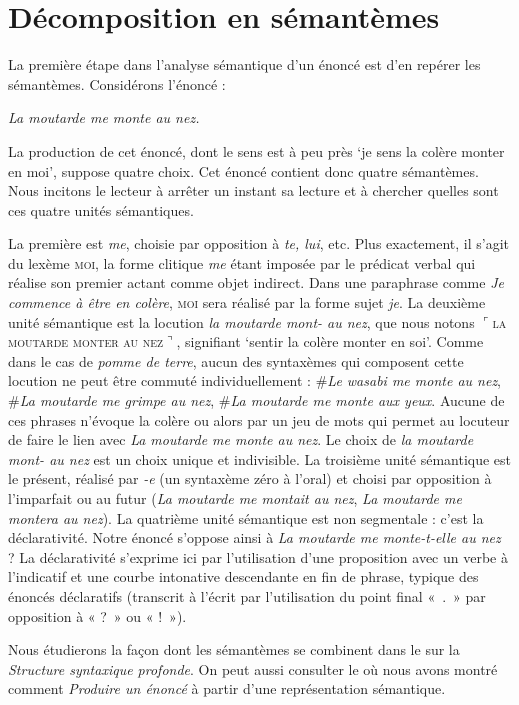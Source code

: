 \section{Décomposition en sémantèmes}\label{sec:2.3.5}

La première étape dans l’analyse sémantique d’un énoncé est d’en repérer les sémantèmes. Considérons l’énoncé :

\ea\itshape La moutarde me monte au nez.\z

La production de cet énoncé, dont le sens est à peu près ‘je sens la colère monter en moi’, suppose quatre choix. Cet énoncé contient donc quatre sémantèmes. Nous incitons le lecteur à arrêter un instant sa lecture et à chercher quelles sont ces quatre unités sémantiques.

La première est \textit{me}, choisie par opposition à \textit{te, lui}, etc. Plus exactement, il s’agit du lexème \textsc{moi}, la forme clitique \textit{me} étant imposée par le prédicat verbal qui réalise son premier actant comme objet indirect. Dans une paraphrase comme \textit{Je commence à être en colère}, \textsc{moi} sera réalisé par la forme sujet \textit{je}. La deuxième unité sémantique est la locution \textit{la moutarde mont- au nez}, que nous notons $⌜$\textsc{la} \textsc{moutarde} \textsc{monter} \textsc{au} \textsc{nez}$⌝$, signifiant ‘sentir la colère monter en soi’. Comme dans le cas de \textit{pomme de terre}, aucun des syntaxèmes qui composent cette locution ne peut être commuté individuellement : \#\textit{Le wasabi me monte au nez}, \#\textit{La moutarde me grimpe au nez}, \#\textit{La moutarde me monte aux yeux}. Aucune de ces phrases n’évoque la colère ou alors par un jeu de mots qui permet au locuteur de faire le lien avec \textit{La moutarde me monte au nez}. Le choix de \textit{la moutarde mont- au nez} est un choix unique et indivisible. La troisième unité sémantique est le présent, réalisé par \textit{{}-e} (un syntaxème zéro à l’oral) et choisi par opposition à l’imparfait ou au futur (\textit{La moutarde me montait au nez}, \textit{La moutarde me montera au nez}). La quatrième unité sémantique est non segmentale : c’est la déclarativité. Notre énoncé s’oppose ainsi à \textit{La moutarde me monte-t-elle au nez} ? La déclarativité s’exprime ici par l’utilisation d’une proposition avec un verbe à l’indicatif et une courbe intonative descendante en fin de phrase, typique des énoncés déclaratifs (transcrit à l’écrit par l’utilisation du point final «~.~» par opposition à « ?~» ou « !~»).

Nous étudierons la façon dont les sémantèmes se combinent dans le  sur la \textit{Structure syntaxique profonde}. On peut aussi consulter le  où nous avons montré comment \textit{Produire un énoncé} à partir d’une représentation sémantique.%

